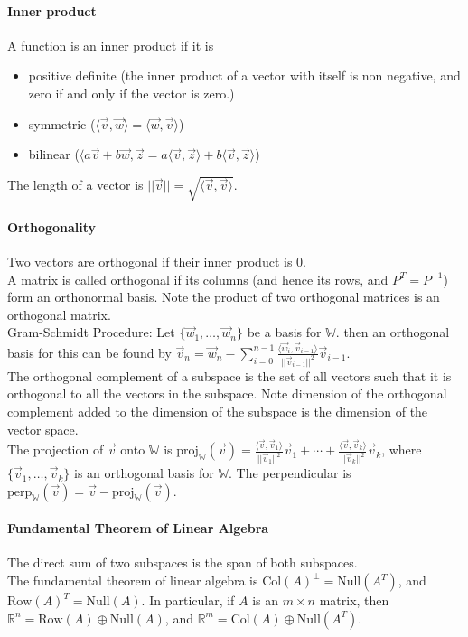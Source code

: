 \documentclass[10pt,letter]{article}
\begin{document}
\paragraph{Inner product}
A function is an inner product if it is 
\begin{itemize}
    \item positive definite (the inner product of a vector with itself is non negative, and zero if and only if the vector is zero.)
    \item symmetric ($\langle\vec{v},\vec{w}\rangle=\langle\vec{w},\vec{v}\rangle$)
    \item bilinear ($\langle a\vec{v}+b\vec{w},\vec{z}=a\langle\vec{v},\vec{z}\rangle+b\langle\vec{v},\vec{z}\rangle$)
\end{itemize}
The length of a vector is $||\vec{v}||=\sqrt{\langle\vec{v},\vec{v}\rangle}$. 

\paragraph{Orthogonality}
Two vectors are orthogonal if their inner product is 0. \\ 
A matrix is called orthogonal if its columns (and hence its rows, and $P^T=P^{-1}$) form an orthonormal basis. Note the product of two orthogonal matrices is an orthogonal matrix. \\ 
Gram-Schmidt Procedure: Let $\{\vec{w}_1,\ldots,\vec{w}_n\}$ be a basis for $\mathbb{W}$. then an orthogonal basis for this can be found by $\vec{v}_n=\vec{w}_n-\sum_{i=0}^{n-1}\frac{\langle\vec{w}_i,\vec{v}_{i-1}\rangle}{||\vec{v}_{i-1}||^2}\vec{v}_{i-1}$.\\ 
The orthogonal complement of a subspace is the set of all vectors such that it is orthogonal to all the vectors in the subspace. Note dimension of the orthogonal complement added to the dimension of the subspace is the dimension of the vector space.\\ 
The projection of $\vec{v}$ onto $\mathbb{W}$ is $\text{proj}_\mathbb{W}(\vec{v})=\frac{\langle\vec{v},\vec{v}_1\rangle}{||\vec{v}_1||^2}\vec{v}_1+\cdots+\frac{\langle\vec{v},\vec{v}_k\rangle}{||\vec{v}_k||^2}\vec{v}_k$, where $\{\vec{v}_1,\ldots,\vec{v}_k\}$ is an orthogonal basis for $\mathbb{W}$. The perpendicular is $\text{perp}_\mathbb{W}(\vec{v})=\vec{v}-\text{proj}_\mathbb{W}(\vec{v})$. 

\paragraph{Fundamental Theorem of Linear Algebra}
The direct sum of two subspaces is the span of both subspaces. \\ 
The fundamental theorem of linear algebra is $\text{Col}(A)^\perp=\text{Null}(A^T)$, and $\text{Row}(A)^T=\text{Null}(A)$. In particular, if $A$ is an $m\times n$ matrix, then $\mathbb{R}^n=\text{Row}(A)\oplus\text{Null}(A)$, and $\mathbb{R}^m=\text{Col}(A)\oplus\text{Null}(A^T)$. 
\end{document}
